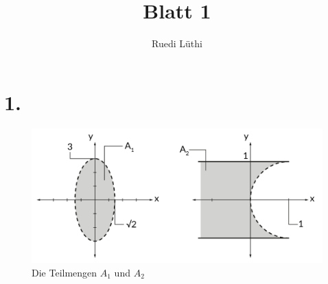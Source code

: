 \documentclass[11pt,a4paper]{article}
\author{Ruedi Lüthi}
\title{Blatt 1}
\newcommand{\1}    	{\mathbbm{1}}
\begin{document}
	\maketitle
	
	\section*{1.}
	
	\begin{figure}[!h]
  	\centering
 	\includegraphics[width=13cm]{Blatt01_1.png}
  	\caption{Die Teilmengen \(A_1\) und \(A_2\)}
	\end{figure}
\end{document}
